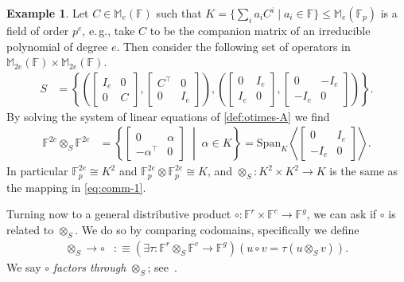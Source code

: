 \documentclass[11pt]{article}
\numberwithin{equation}{section}
\theoremstyle{definition}
\theoremstyle{plain}
\newcommand{\eg}{e.\,g.}
\numberwithin{equation}{section}
\theoremstyle{plain}       %
\theoremstyle{remark}
\theoremstyle{definition}
\newtheorem{ex}[equation]{Example}  %
\numberwithin{figure}{section}
\numberwithin{table}{section}
\newcommand{\bbF}{\mathbb{F}}  %
\begin{document}
\begin{ex}\label{ex:tensor-M2}
	Let $C\in \mathbb{M}_e(\bbF)$ such that $K=\{ \sum_i a_i C^i \mid a_i\in
	\bbF\}\leq \mathbb{M}_e(\bbF_p)$ is a field of order $p^e$,  \eg, take $C$
	to be the companion matrix of an irreducible polynomial of degree $e$.  Then
	consider the following set of operators in $\mathbb{M}_{2e}(\bbF)\times
	\mathbb{M}_{2e}(\bbF)$.
	\begin{align*}
		S & =\left\{\left(\begin{bmatrix} I_e & 0\\ 0 & C \end{bmatrix},
			\begin{bmatrix} C^{\top} & 0\\ 0 & I_e \end{bmatrix}\right),
			\left(\begin{bmatrix} 0 & I_e \\ I_e & 0 \end{bmatrix},
			\begin{bmatrix} 0 & -I_e\\ -I_e & 0 \end{bmatrix}\right)\right\}.
	\end{align*}
	By solving the system of linear equations of \eqref{def:otimes-A} we find
	\begin{align*}
		\bbF^{2e}\otimes_S \bbF^{2e}
	& = \left\{\begin{bmatrix} 0 & \alpha\\ -\alpha^{\top} & 0 \end{bmatrix} 
			\;\middle|\; \alpha\in K\right\}= \mathrm{Span}_K\left\langle 
			\begin{bmatrix} 0 & I_e\\ -I_e & 0\end{bmatrix}\right\rangle.
	\end{align*}
	In particular $\bbF_p^{2e}\cong K^2$ and $\bbF_p^{2e}\otimes\bbF_p^{2e}\cong
	K$, and $\otimes_S:K^2\times K^2\to K$ is the same as the mapping in
	\eqref{eq:comm-1}.
\end{ex}

Turning now to a general distributive product $\circ:\bbF^r\times \bbF^c\to
\bbF^g$, we can ask if $\circ$ is related to $\otimes_S$.  We do so by comparing
codomains, specifically we define
\begin{align}\label{def:factor-through}
	\otimes_S \to \circ & :\equiv
	(\exists \tau:\bbF^r\otimes_S \bbF^c\to \bbF^g)( u\circ v= \tau(u\otimes_S v) ).
\end{align}
We say $\circ$ \emph{factors through} $\otimes_S$; 
%
see~\cite[(2.4)]{BW:autotopism}.    %
\end{document}
